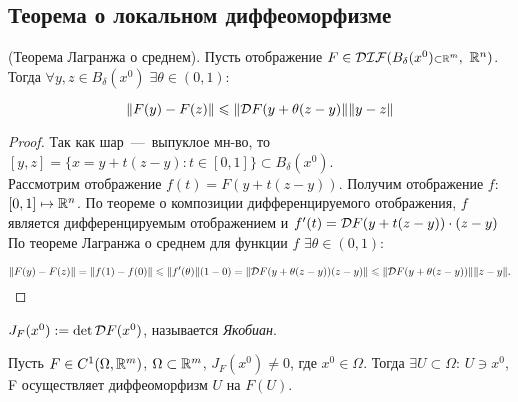 \newpage
\subsection{Теорема о локальном диффеоморфизме}
\begin{theorem} (Теорема Лагранжа о среднем).
    Пусть отображение $F \in \mathcal{DIF}(B_\delta (x^0) {\scriptstyle \subset \mathbb{R}^m},\ \mathbb{R}^n)$. Тогда $\forall y, z \in B_\delta (x^0)\; \exists \theta \in (0, 1)$:

$$\|F(y) - F(z)\| \leqslant \|\mathcal{D} F(y + \theta(z - y)\| \|y - z\|$$
\end{theorem}
\begin{proof}
Так как шар~---~выпуклое мн-во, то $[y, z] = \{x = y + t(z - y) : t \in [0, 1]\} \subset B_\delta(x^0)$.\\
Рассмотрим отображение $f(t) = F(y + t(z - y))$. Получим отображение $f$: $[0, 1] \mapsto \mathbb{R}^n$.
По теореме о композиции дифференцируемого отображения, $f$ является дифференцируемым отображением и $f'(t) = \mathcal{D} F(y + t(z - y)) \cdot (z - y)$ 
По теореме Лагранжа о среднем для функции $f$ $\exists \theta \in (0, 1)$:

$$\|F(y) - F(z)\| = \|f(1) - f(0)\| \leqslant \|f'(\theta)\|(1 - 0) = \|\mathcal{D} F(y + \theta(z - y))(z - y)\| \leqslant \|\mathcal{D} F(y + \theta(z - y))\| \|z - y\|.$$
\end{proof}
\begin{definition}
    $J_F(x^0) := \det \mathcal{D} F(x^0)$, называется \textit{Якобиан}.
\end{definition}
\begin{theorem}

    Пусть $F \in C^1(\Omega, \mathbb{R}^m)$, $\Omega \subset \mathbb{R}^m$, $J_F(x^0) \neq 0$, где $x^0 \in \Omega$. Тогда $\exists U \subset \Omega$: $U \ni x^0$, F осуществляет диффеоморфизм $U$ на $F(U)$.
\end{theorem}
